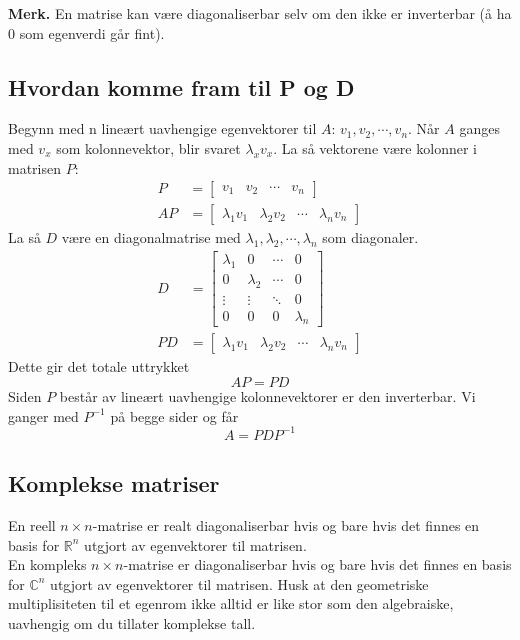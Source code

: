 \documentclass[12pt,a4paper,norsk]{article}
\newcommand{\R}{\mathbb{R}}
\newcommand{\C}{\mathbb{C}}
\begin{document}
\textbf{Merk.} En matrise kan være diagonaliserbar selv om den ikke er
inverterbar (å ha 0 som egenverdi går fint).

\subsection{Hvordan komme fram til P og D}
Begynn med n lineært uavhengige egenvektorer til $A$: $v_{1}, v_{2}, \cdots, v_{n}$.
Når $A$ ganges med $v_{x}$ som kolonnevektor, blir svaret $\lambda_{x} v_{x}$. La så
vektorene være kolonner i matrisen $P$:
\begin{align*}
  P &= \begin{bmatrix}
    v_{1} & v_{2} & \cdots & v_{n}
  \end{bmatrix} \\
  AP &= \begin{bmatrix}
    \lambda_{1}v_{1} & \lambda_{2}v_{2} & \cdots & \lambda_{n}v_{n}
  \end{bmatrix}
\end{align*}
La så $D$ være en diagonalmatrise med $\lambda_{1}, \lambda_{2}, \cdots, \lambda_{n}$ som diagonaler.
\begin{align*}
  D &= \begin{bmatrix}
    \lambda_{1} & 0 & \cdots & 0 \\
    0 & \lambda_{2} & \cdots & 0 \\
    \vdots & \vdots & \ddots & 0 \\
    0 & 0 & 0 & \lambda_{n}
  \end{bmatrix} \\
  PD &= \begin{bmatrix}
    \lambda_{1}v_{1} & \lambda_{2}v_{2} & \cdots & \lambda_{n}v_{n}
  \end{bmatrix}
\end{align*}
Dette gir det totale uttrykket
\[AP = PD\]
Siden $P$ består av lineært uavhengige kolonnevektorer er den inverterbar. Vi
ganger med $P^{-1}$ på begge sider og får
\[A = PDP^{-1}\]

\subsection{Komplekse matriser}
En reell $n \times n$-matrise er realt diagonaliserbar hvis og bare hvis det finnes
en basis for $\R^{n}$ utgjort av egenvektorer til matrisen. \\
En kompleks $n \times n$-matrise er diagonaliserbar hvis og bare hvis det finnes en
basis for $\C^{n}$ utgjort av egenvektorer til matrisen. Husk at den geometriske
multiplisiteten til et egenrom ikke alltid er like stor som den algebraiske,
uavhengig om du tillater komplekse tall.
\end{document}
